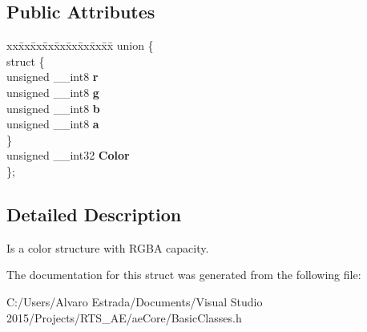 \subsection*{Public Attributes}
\begin{DoxyCompactItemize}
\item 
\begin{tabbing}
xx\=xx\=xx\=xx\=xx\=xx\=xx\=xx\=xx\=\kill
union \{\\
\>struct \{\\
\>\>unsigned \_\_int8 {\bfseries r}\\
\>\>unsigned \_\_int8 {\bfseries g}\\
\>\>unsigned \_\_int8 {\bfseries b}\\
\>\>unsigned \_\_int8 {\bfseries a}\\
\>\} \hypertarget{unionae_core_1_1ae_r_g_b_quad_1_1_0D10_a9102714f11403077da0250f6c893baec}{}\label{unionae_core_1_1ae_r_g_b_quad_1_1_0D10_a9102714f11403077da0250f6c893baec}
\\
\>unsigned \_\_int32 {\bfseries Color}\\
\}; \hypertarget{structae_core_1_1ae_r_g_b_quad_ae4f5edbb8c5c41ff10059a338b93d946}{}\label{structae_core_1_1ae_r_g_b_quad_ae4f5edbb8c5c41ff10059a338b93d946}
\\

\end{tabbing}\end{DoxyCompactItemize}


\subsection{Detailed Description}
Is a color structure with R\+G\+BA capacity. 

The documentation for this struct was generated from the following file\+:\begin{DoxyCompactItemize}
\item 
C\+:/\+Users/\+Alvaro Estrada/\+Documents/\+Visual Studio 2015/\+Projects/\+R\+T\+S\+\_\+\+A\+E/ae\+Core/Basic\+Classes.\+h\end{DoxyCompactItemize}

